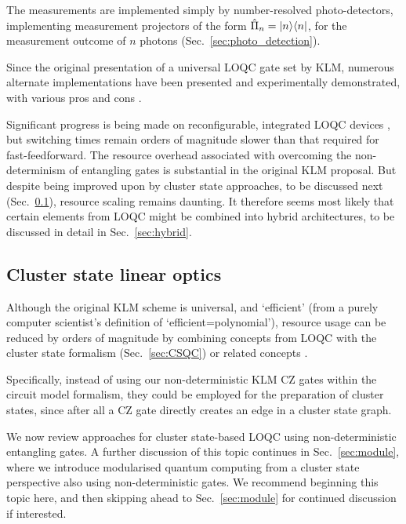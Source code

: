 The measurements are implemented simply by number-resolved photo-detectors, implementing measurement projectors of the form \mbox{$\hat\Pi_n=|n\rangle\langle n|$}, for the measurement outcome of $n$ photons (Sec.~\ref{sec:photo_detection}).

Since the original presentation of a universal LOQC gate set by KLM, numerous alternate implementations have been presented and experimentally demonstrated, with various pros and cons \cite{bib:Ralph01, bib:Pittman01, bib:Ralph02, bib:Knill02, bib:Pittman03, bib:MorYoran06}.

Significant progress is being made on reconfigurable, integrated LOQC devices \cite{bib:UniversalLOOBrien}, but switching times remain orders of magnitude slower than that required for fast-feedforward. The resource overhead associated with overcoming the non-determinism of entangling gates is substantial in the original KLM proposal. But despite being improved upon by cluster state approaches, to be discussed next (Sec.~\ref{sec:CS_LO}), resource scaling remains daunting. It therefore seems most likely that certain elements from LOQC might be combined into hybrid architectures, to be discussed in detail in Sec.~\ref{sec:hybrid}.

%
%

\subsection{Cluster state linear optics} \label{sec:CS_LO} 

Although the original KLM scheme is universal, and `efficient' (from a purely computer scientist's definition of `efficient=polynomial'), resource usage can be reduced by orders of magnitude by combining concepts from LOQC with the cluster state formalism (Sec.~\ref{sec:CSQC}) or related concepts \cite{bib:YoranReznik03, bib:Nielsen04, bib:BrowneRudolph05, bib:GilchristHayes05, bib:Lim05, bib:LimBarrett05}.

Specifically, instead of using our non-deterministic KLM CZ gates within the circuit model formalism, they could be employed for the preparation of cluster states, since after all a CZ gate directly creates an edge in a cluster state graph.

We now review approaches for cluster state-based LOQC using non-deterministic entangling gates. A further discussion of this topic continues in Sec.~\ref{sec:module}, where we introduce modularised quantum computing from a cluster state perspective also using non-deterministic gates. We recommend beginning this topic here, and then skipping ahead to Sec.~\ref{sec:module} for continued discussion if interested.

